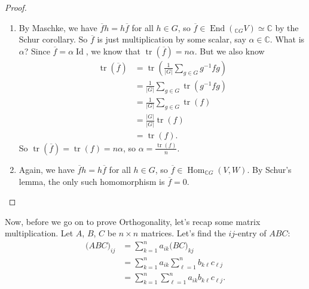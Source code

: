 \documentclass[12pt]{article}
\newcommand{\cx}{\mathbb{C}}
\newcommand\inv[1]{#1^{-1}}
\theoremstyle{definition}
\DeclareMathOperator\End{End}
\DeclareMathOperator\Hom{Hom}
\DeclareMathOperator\Id{Id}
\DeclareMathOperator\tr{tr}
\begin{document}
\begin{proof}
    \noindent
    \begin{enumerate}
        \item By Maschke, we have $\overline{f} h = h \overline{f}$ for all $h \in G$, so $\overline{f} \in \End(_{\cx G} V) \simeq \cx$ by the Schur corollary. So $\overline{f}$ is just multiplication by some scalar, say $\alpha \in \cx$. What is $\alpha$? Since $\overline{f} = \alpha \Id$, we know that $\tr \left( \overline{f} \right) = n \alpha$. But we also know 
        \begin{equation}
            \begin{split}
                \tr \left( \overline{f} \right) & = \tr \left( \frac{1}{|G|} \sum\limits_{g \in G} \inv{g} f g \right) \\
                & = \frac{1}{|G|} \sum\limits_{g \in G} \tr \left( \inv{g} f g \right) \\
                & = \frac{1}{|G|} \sum\limits_{g \in G} \tr(f) \\
                & = \frac{|G|}{|G|} \tr(f) \\
                & = \tr(f).
            \end{split}
        \end{equation}
        So $\tr \left( \overline{f} \right) = \tr(f) = n \alpha$, so $\alpha = \frac{\tr(f)}{n}$. \checkmark
        \item Again, we have $\overline{f} h = h \overline{f}$ for all $h \in G$, so $\overline{f} \in \Hom_{\cx G}(V,W)$. By Schur's lemma, the only such homomorphism is $\overline{f} = 0$. \checkmark
    \end{enumerate}
\end{proof}
Now, before we go on to prove Orthogonality, let's recap some matrix multiplication. Let $A$, $B$, $C$ be $n \times n$ matrices. Let's find the $ij$-entry of $ABC$:
\begin{equation}
    \begin{split}
        \big( ABC \big)_{ij} & = \sum\limits_{k = 1}^n a_{ik} \big( BC \big)_{kj} \\
        & =  \sum\limits_{k = 1}^n a_{ik} \sum\limits_{\ell = 1}^n b_{k \ell} c_{\ell j} \\
        & = \sum\limits_{k = 1}^n \sum\limits_{\ell = 1}^n a_{i k} b_{k \ell} c_{\ell j}.
    \end{split}
\end{equation}
\end{document}
